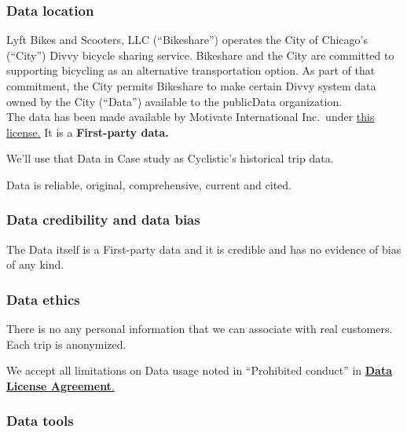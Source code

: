 \documentclass[
]{article}
\begin{document}
\hypertarget{data-location}{%
\subsubsection{Data location}\label{data-location}}

Lyft Bikes and Scooters, LLC (``Bikeshare'') operates the City of
Chicago's (``City'') Divvy bicycle sharing service. Bikeshare and the
City are committed to supporting bicycling as an alternative
transportation option. As part of that commitment, the City permits
Bikeshare to make certain Divvy system data owned by the City (``Data'')
available to the publicData organization.\\

The data has been made available by Motivate International Inc.~under
\href{https://www.divvybikes.com/data-license-agreement}{this license.}
It is a \textbf{First-party data.}

We'll use that Data in Case study as Cyclistic's historical trip data.

Data is reliable, original, comprehensive, current and cited.\\

\hypertarget{data-credibility-and-data-bias}{%
\subsubsection{Data credibility and data
bias}\label{data-credibility-and-data-bias}}

The Data itself is a First-party data and it is credible and has no
evidence of bias of any kind.

\hypertarget{data-ethics}{%
\subsubsection{Data ethics}\label{data-ethics}}

There is no any personal information that we can associate with real
customers.\\

Each trip is anonymized.

We accept all limitations on Data usage noted in ``Prohibited conduct''
in \href{https://www.divvybikes.com/data-license-agreement}{\textbf{Data
License Agreement}.}

\hypertarget{data-tools}{%
\subsubsection{Data tools}\label{data-tools}}
\end{document}
